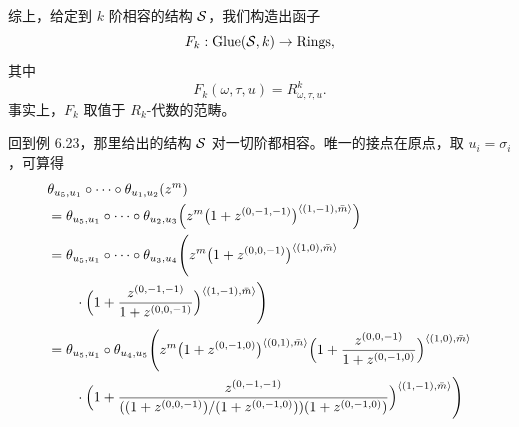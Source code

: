 综上，给定到 $k$ 阶相容的结构 $\mathcal{S}$，我们构造出函子
\[
  F_k:\operatorname{Glue}(\mathcal{S},k)\to\operatorname{Rings},
\]
其中
\[
  F_k(\omega,\tau,u)=R^k_{\omega,\tau,u}.
\]
事实上，$F_k$ 取值于 $R_k$-代数的范畴。

\begin{example}
回到例 6.23，那里给出的结构 $\mathcal{S}$ 对一切阶都相容。唯一的接点在原点，取 $u_i=\sigma_i$，可算得
\[
  \begin{aligned}
    &\theta_{u_5,u_1}\circ\cdots\circ\theta_{u_1,u_2}(z^m)\\
    &=\theta_{u_5,u_1}\circ\cdots\circ\theta_{u_2,u_3}
    \Bigl(z^m\bigl(1+z^{(0,-1,-1)}\bigr)^{\langle(1,-1),\bar m\rangle}\Bigr)\\
    &=\theta_{u_5,u_1}\circ\cdots\circ\theta_{u_3,u_4}
    \Biggl(z^m\bigl(1+z^{(0,0,-1)}\bigr)^{\langle(1,0),\bar m\rangle}\\
    &\qquad\cdot\Bigl(1+\frac{z^{(0,-1,-1)}}{1+z^{(0,0,-1)}}\Bigr)^{\langle(1,-1),\bar m\rangle}\Biggr)\\
    &=\theta_{u_5,u_1}\circ\theta_{u_4,u_5}
    \Biggl(z^m\bigl(1+z^{(0,-1,0)}\bigr)^{\langle(0,1),\bar m\rangle}
    \Bigl(1+\frac{z^{(0,0,-1)}}{1+z^{(0,-1,0)}}\Bigr)^{\langle(1,0),\bar m\rangle}\\
    &\qquad\cdot\Bigl(1+\frac{z^{(0,-1,-1)}}{((1+z^{(0,0,-1)})/(1+z^{(0,-1,0)}))(1+z^{(0,-1,0)})}\Bigr)^{\langle(1,-1),\bar m\rangle}\Biggr)
  \end{aligned}
\]


\end{example}
